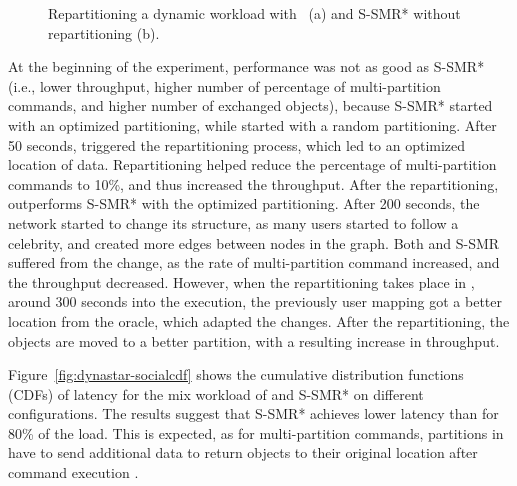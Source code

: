 \begin{figure}[ht!]
\begin{subfigure}{.48\textwidth}
    \caption{}
  \end{subfigure}
  \caption{Repartitioning a dynamic workload with \dynastar~(a) and S-SMR*
  without repartitioning (b).}%
  \label{fig:socialcelebrity}
\end{figure}

At the beginning of the experiment, \dynastar performance was not as good as
S-SMR* (i.e., lower throughput, higher number of percentage of multi-partition
commands, and higher number of exchanged objects), because S-SMR* started with
an optimized partitioning, while \dynastar started with a random partitioning.
After 50 seconds, \dynastar triggered the repartitioning process, which led to
an optimized location of data. Repartitioning helped reduce the percentage of
multi-partition commands to 10\%, and thus increased the throughput. After the
repartitioning, \dynastar outperforms S-SMR* with the optimized partitioning.
After 200 seconds, the network started to change its structure, as many users
started to follow a celebrity, and created more edges between nodes in the
graph. Both \dynastar and S-SMR suffered from the change, as the rate of
multi-partition command increased, and the throughput decreased. However, when
the repartitioning takes place in \dynastar, around 300 seconds into the
execution, the previously user mapping got a better location from the oracle,
which adapted the changes. After the repartitioning, the objects are moved to a
better partition, with a resulting increase in throughput.

Figure~\ref{fig:dynastar-socialcdf} shows the cumulative distribution functions (CDFs) of
latency for the mix workload of \dynastar and S-SMR* on different
configurations. The results suggest that S-SMR* achieves lower latency than
\dynastar for 80\% of the load. This is expected, as for multi-partition
commands, partitions in \dynastar have to send additional data to return objects
to their original location after command execution .


